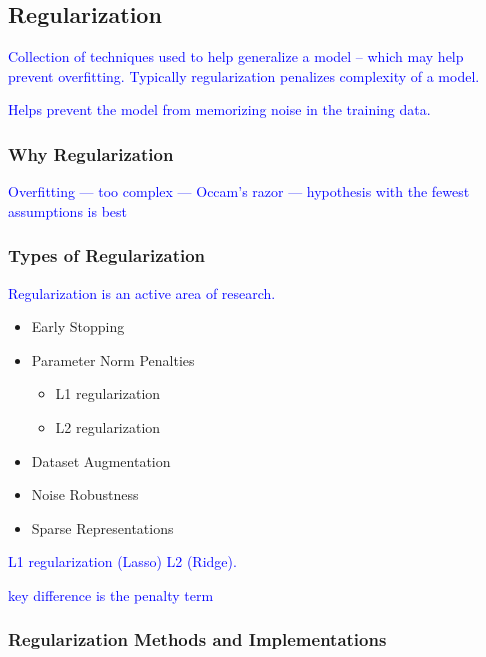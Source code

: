 \subsection{Regularization}


\textcolor{blue}{Collection of techniques used to help generalize a model -- which may help prevent overfitting. Typically regularization penalizes complexity of a model.}


\textcolor{blue}{Helps prevent the model from memorizing noise in the training data.}


\subsubsection{Why Regularization}

\textcolor{blue}{Overfitting --- too complex --- Occam's razor --- hypothesis with the fewest assumptions is best}


\subsubsection{Types of Regularization}

\textcolor{blue}{Regularization is an active area of research.}

\begin{itemize}
	\item Early Stopping
	\item Parameter Norm Penalties
	\begin{itemize}
		\item L1 regularization
		\item L2 regularization
	\end{itemize}
	\item Dataset Augmentation
	\item Noise Robustness
	\item Sparse Representations
\end{itemize}


\textcolor{blue}{L1 regularization (Lasso) L2 (Ridge).}

\textcolor{blue}{key difference is the penalty term}


\subsubsection{Regularization Methods and Implementations}

